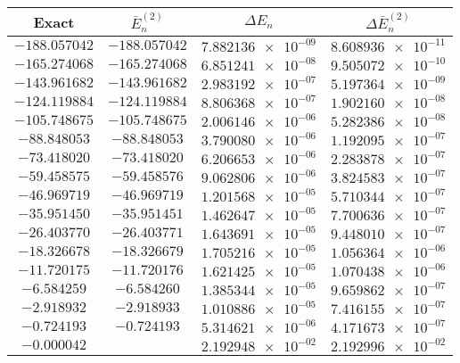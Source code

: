 \documentclass[12pt]{article}
\begin{document}
\begin{table}[H]
\begin{center}
\begin{tabular}{cccc}
\toprule[1.5pt]
Exact & $\bar{E}_n^{(2)}$ & $\Delta E_n$ & $\Delta \bar{E}_n^{(2)}$ \\
 \midrule
$\num{-188.057042}$ & $\num{-188.057042}$ & $\num{7.882136e-09}$ & $\num{8.608936e-11} $ \\ 
$\num{-165.274068}$ & $\num{-165.274068}$ & $\num{6.851241e-08}$ & $\num{9.505072e-10} $ \\
$\num{-143.961682}$ & $\num{-143.961682}$ & $\num{2.983192e-07}$ & $\num{5.197364e-09} $ \\
$\num{-124.119884}$ & $\num{-124.119884}$ & $\num{8.806368e-07}$ & $\num{1.902160e-08} $ \\
$\num{-105.748675}$ & $\num{-105.748675}$ & $\num{2.006146e-06}$ & $\num{5.282386e-08} $ \\
$\num{-88.848053 }$ & $\num{-88.848053 }$ & $\num{3.790080e-06}$ & $\num{1.192095e-07} $ \\
$\num{-73.418020 }$ & $\num{-73.418020 }$ & $\num{6.206653e-06}$ & $\num{2.283878e-07} $ \\
$\num{-59.458575 }$ & $\num{-59.458576 }$ & $\num{9.062806e-06}$ & $\num{3.824583e-07} $ \\
$\num{-46.969719 }$ & $\num{-46.969719 }$ & $\num{1.201568e-05}$ & $\num{5.710344e-07} $ \\
$\num{-35.951450 }$ & $\num{-35.951451 }$ & $\num{1.462647e-05}$ & $\num{7.700636e-07} $ \\
$\num{-26.403770 }$ & $\num{-26.403771 }$ & $\num{1.643691e-05}$ & $\num{9.448010e-07} $ \\
$\num{-18.326678 }$ & $\num{-18.326679 }$ & $\num{1.705216e-05}$ & $\num{1.056364e-06} $ \\
$\num{-11.720175 }$ & $\num{-11.720176 }$ & $\num{1.621425e-05}$ & $\num{1.070438e-06} $ \\
$\num{-6.584259  }$ & $\num{-6.584260  }$ & $\num{1.385344e-05}$ & $\num{9.659862e-07} $ \\
$\num{-2.918932  }$ & $\num{-2.918933  }$ & $\num{1.010886e-05}$ & $\num{7.416155e-07} $ \\
$\num{-0.724193  }$ & $\num{-0.724193  }$ & $\num{5.314621e-06}$ & $\num{4.171673e-07} $ \\
$\num{-0.000042  }$ & \color{red}{$+\num{0.021888  }$} & $\num{2.192948e-02}$ & $\num{2.192996e-02} $ \\
\bottomrule
\end{tabular}
\end{center}
\end{table}
\end{document}
